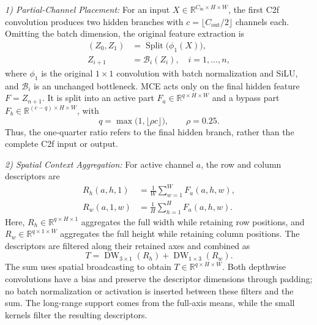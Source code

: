 \documentclass[journal]{IEEEtran}
\begin{document}
\emph{1) Partial-Channel Placement:}
For an input $X\in\mathbb{R}^{C_{\mathrm{in}}\times H\times W}$, the first C2f convolution produces two hidden branches with $c=\lfloor C_{\mathrm{out}}/2\rfloor$ channels each. Omitting the batch dimension, the original feature extraction is
\begin{align}
(Z_0,Z_1) &= \operatorname{Split}\bigl(\phi_1(X)\bigr), \label{eq:pac-split}\\
Z_{i+1} &= \mathcal{B}_i(Z_i),\quad i=1,\ldots,n, \label{eq:pac-bottlenecks}
\end{align}
where $\phi_1$ is the original $1\times1$ convolution with batch normalization and SiLU, and $\mathcal{B}_i$ is an unchanged bottleneck. MCE acts only on the final hidden feature $F=Z_{n+1}$. It is split into an active part $F_a\in\mathbb{R}^{q\times H\times W}$ and a bypass part $F_b\in\mathbb{R}^{(c-q)\times H\times W}$, with
\begin{equation}
q=\max\bigl(1,\lfloor\rho c\rfloor\bigr),\qquad \rho=0.25.
\label{eq:pac-active-channels}
\end{equation}
Thus, the one-quarter ratio refers to the final hidden branch, rather than the complete C2f input or output.

\emph{2) Spatial Context Aggregation:}
For active channel $a$, the row and column descriptors are
\begin{align}
R_h(a,h,1) &= \frac{1}{W}\sum_{w=1}^{W}F_a(a,h,w), \label{eq:pac-row}\\
R_w(a,1,w) &= \frac{1}{H}\sum_{h=1}^{H}F_a(a,h,w). \label{eq:pac-column}
\end{align}
Here, $R_h\in\mathbb{R}^{q\times H\times1}$ aggregates the full width while retaining row positions, and $R_w\in\mathbb{R}^{q\times1\times W}$ aggregates the full height while retaining column positions. The descriptors are filtered along their retained axes and combined as
\begin{equation}
T=\operatorname{DW}_{3\times1}(R_h)
 +\operatorname{DW}_{1\times3}(R_w).
\label{eq:pac-context}
\end{equation}
The sum uses spatial broadcasting to obtain $T\in\mathbb{R}^{q\times H\times W}$. Both depthwise convolutions have a bias and preserve the descriptor dimensions through padding; no batch normalization or activation is inserted between these filters and the sum. The long-range support comes from the full-axis means, while the small kernels filter the resulting descriptors.
\end{document}
